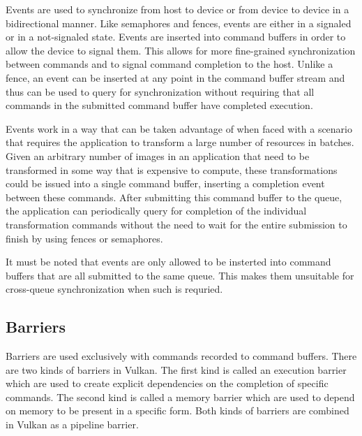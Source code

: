       Events are used to synchronize from \gls{host} to device or from device to device in a bidirectional manner.
      Like semaphores and fences, events are either in a signaled or in a not-signaled state.
      Events are inserted into command buffers in order to allow the device to signal them.
      This allows for more fine-grained synchronization between commands and to signal command completion to the \gls{host}.
      Unlike a fence, an event can be inserted at any point in the command buffer stream and thus can be used to query for synchronization without requiring that all commands in the submitted command buffer have completed execution.

      Events work in a way that can be taken advantage of when faced with a scenario that requires the \gls{application} to transform a large number of resources in batches.
      Given an arbitrary number of images in an \gls{application} that need to be transformed in some way that is expensive to compute, these transformations could be issued into a single command buffer, inserting a completion event between these commands.
      After submitting this command buffer to the queue, the \gls{application} can periodically query for completion of the individual transformation commands without the need to wait for the entire submission to finish by using fences or semaphores.

      It must be noted that events are only allowed to be insterted into command buffers that are all submitted to the same queue.
      This makes them unsuitable for cross-queue synchronization when such is requried.

    \subsection{Barriers}
    \label{sub:Barriers}
      Barriers are used exclusively with commands recorded to command buffers.
      There are two kinds of barriers in Vulkan.
      The first kind is called an execution barrier which are used to create explicit dependencies on the completion of specific commands.
      The second kind is called a memory barrier which are used to depend on memory to be present in a specific form.
      Both kinds of barriers are combined in Vulkan as a pipeline barrier.

